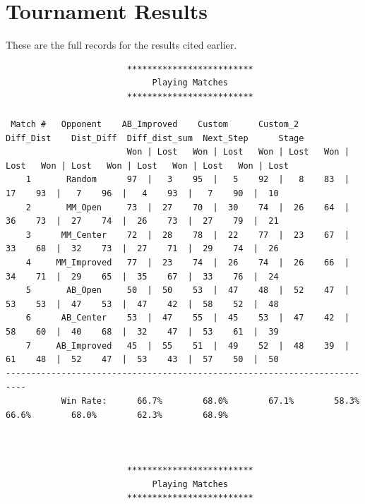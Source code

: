 \documentclass[a4paper,12pt]{article}
\begin{document}
\newpage

\section{Tournament Results}
These are the full records for the results cited earlier.
\begin{verbatim}
                        *************************                         
                             Playing Matches                              
                        *************************                         

 Match #   Opponent    AB_Improved    Custom      Custom_2     Diff_Dist    Dist_Diff  Diff_dist_sum  Next_Step      Stage    
                        Won | Lost   Won | Lost   Won | Lost   Won | Lost   Won | Lost   Won | Lost   Won | Lost   Won | Lost 
    1       Random      97  |   3    95  |   5    92  |   8    83  |  17    93  |   7    96  |   4    93  |   7    90  |  10  
    2       MM_Open     73  |  27    70  |  30    74  |  26    64  |  36    73  |  27    74  |  26    73  |  27    79  |  21  
    3      MM_Center    72  |  28    78  |  22    77  |  23    67  |  33    68  |  32    73  |  27    71  |  29    74  |  26  
    4     MM_Improved   77  |  23    74  |  26    74  |  26    66  |  34    71  |  29    65  |  35    67  |  33    76  |  24  
    5       AB_Open     50  |  50    53  |  47    48  |  52    47  |  53    53  |  47    53  |  47    42  |  58    52  |  48  
    6      AB_Center    53  |  47    55  |  45    53  |  47    42  |  58    60  |  40    68  |  32    47  |  53    61  |  39  
    7     AB_Improved   45  |  55    51  |  49    52  |  48    39  |  61    48  |  52    47  |  53    43  |  57    50  |  50  
--------------------------------------------------------------------------
           Win Rate:      66.7%        68.0%        67.1%        58.3%        66.6%        68.0%        62.3%        68.9%    



                        *************************                         
                             Playing Matches                              
                        *************************                         


\end{verbatim}
\end{document}
